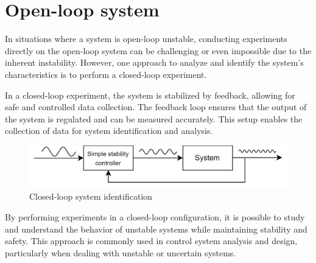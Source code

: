 \section{Open-loop system}

In situations where a system is open-loop unstable, conducting experiments directly on the open-loop system can be challenging or even impossible due to the inherent instability. 
However, one approach to analyze and identify the system's characteristics is to perform a closed-loop experiment.

In a closed-loop experiment, the system is stabilized by feedback, allowing for safe and controlled data collection. 
The feedback loop ensures that the output of the system is regulated and can be measured accurately. 
This setup enables the collection of data for system identification and analysis.
\begin{figure}[H]
    \centering
    \includegraphics[width=0.6\linewidth]{images/cle.png}
    \caption{Closed-loop system identification}
\end{figure}
By performing experiments in a closed-loop configuration, it is possible to study and understand the behavior of unstable systems while maintaining stability and safety.
This approach is commonly used in control system analysis and design, particularly when dealing with unstable or uncertain systems.